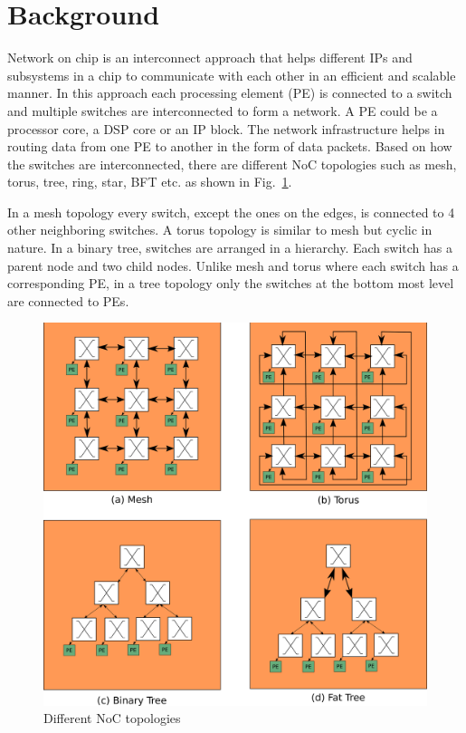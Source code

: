 \section{Background}
\label{sec:background}
Network on chip is an interconnect approach that helps different IPs and subsystems in a chip to communicate with each other in an efficient and scalable manner. 
In this approach each processing element (PE) is connected to a switch and multiple switches are interconnected to form a network.
A PE could be a processor core, a DSP core or an IP block.
The network infrastructure helps in routing data from one PE to another in the form of data packets. 
Based on how the switches are interconnected, there are different NoC topologies such as mesh, torus, tree, ring, star, BFT etc. as shown in Fig.~\ref{fig:topologies}.

In a mesh topology every switch, except the ones on the edges, is connected to 4 other neighboring switches.
A torus topology is similar to mesh but cyclic in nature.
In a binary tree, switches are arranged in a hierarchy.
Each switch has a parent node and two child nodes.
Unlike mesh and torus where each switch has a corresponding PE, in a tree topology only the switches at the bottom most level are connected to PEs.


\begin{figure}[t]
\centering
   \includegraphics[width=\columnwidth]{Figures/topologies.pdf}
   \caption{Different NoC topologies}
   \label{fig:topologies}
\end{figure}

